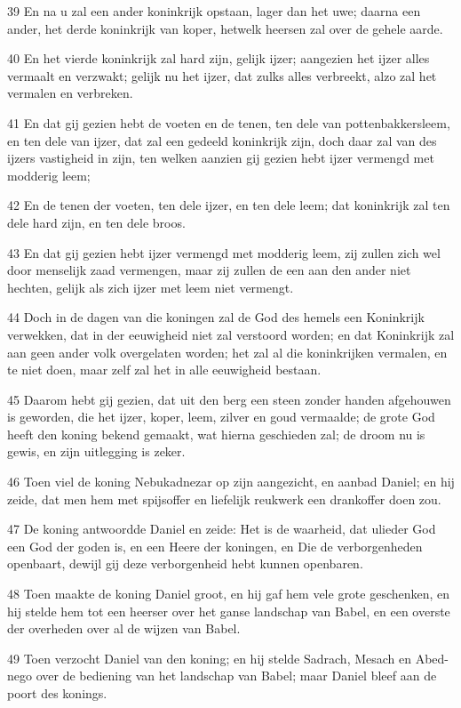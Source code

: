 \par 39 En na u zal een ander koninkrijk opstaan, lager dan het uwe; daarna een ander, het derde koninkrijk van koper, hetwelk heersen zal over de gehele aarde.
\par 40 En het vierde koninkrijk zal hard zijn, gelijk ijzer; aangezien het ijzer alles vermaalt en verzwakt; gelijk nu het ijzer, dat zulks alles verbreekt, alzo zal het vermalen en verbreken.
\par 41 En dat gij gezien hebt de voeten en de tenen, ten dele van pottenbakkersleem, en ten dele van ijzer, dat zal een gedeeld koninkrijk zijn, doch daar zal van des ijzers vastigheid in zijn, ten welken aanzien gij gezien hebt ijzer vermengd met modderig leem;
\par 42 En de tenen der voeten, ten dele ijzer, en ten dele leem; dat koninkrijk zal ten dele hard zijn, en ten dele broos.
\par 43 En dat gij gezien hebt ijzer vermengd met modderig leem, zij zullen zich wel door menselijk zaad vermengen, maar zij zullen de een aan den ander niet hechten, gelijk als zich ijzer met leem niet vermengt.
\par 44 Doch in de dagen van die koningen zal de God des hemels een Koninkrijk verwekken, dat in der eeuwigheid niet zal verstoord worden; en dat Koninkrijk zal aan geen ander volk overgelaten worden; het zal al die koninkrijken vermalen, en te niet doen, maar zelf zal het in alle eeuwigheid bestaan.
\par 45 Daarom hebt gij gezien, dat uit den berg een steen zonder handen afgehouwen is geworden, die het ijzer, koper, leem, zilver en goud vermaalde; de grote God heeft den koning bekend gemaakt, wat hierna geschieden zal; de droom nu is gewis, en zijn uitlegging is zeker.
\par 46 Toen viel de koning Nebukadnezar op zijn aangezicht, en aanbad Daniel; en hij zeide, dat men hem met spijsoffer en liefelijk reukwerk een drankoffer doen zou.
\par 47 De koning antwoordde Daniel en zeide: Het is de waarheid, dat ulieder God een God der goden is, en een Heere der koningen, en Die de verborgenheden openbaart, dewijl gij deze verborgenheid hebt kunnen openbaren.
\par 48 Toen maakte de koning Daniel groot, en hij gaf hem vele grote geschenken, en hij stelde hem tot een heerser over het ganse landschap van Babel, en een overste der overheden over al de wijzen van Babel.
\par 49 Toen verzocht Daniel van den koning; en hij stelde Sadrach, Mesach en Abed-nego over de bediening van het landschap van Babel; maar Daniel bleef aan de poort des konings.

